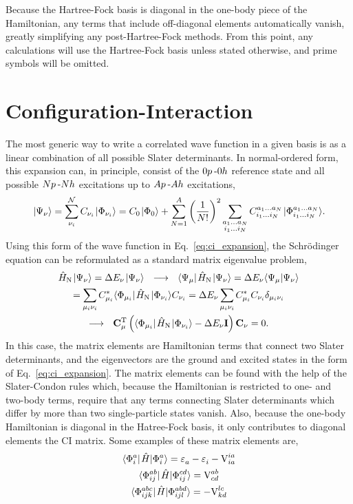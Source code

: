 \documentclass[thesis.tex]{subfiles}
\begin{document}
Because the Hartree-Fock basis is diagonal in the one-body piece of the Hamiltonian, any terms that include off-diagonal elements automatically vanish, greatly simplifying any post-Hartree-Fock methods.  From this point, any calculations will use the Hartree-Fock basis unless stated otherwise, and prime symbols will be omitted.


\section{Configuration-Interaction}
The most generic way to write a correlated wave function in a given basis is as a linear combination of all possible Slater determinants.  In normal-ordered form, this expansion can, in principle, consist of the $0p\hspace{2pt}\text{-}0h$ reference state and all possible $Np\hspace{2pt}\text{-}Nh$ excitations up to $Ap\hspace{2pt}\text{-}Ah$ excitations,
\begin{equation} \label{eq:ci_expansion}
  \hspace{1pt}\lvert \Psi_{\nu} \rangle = \sum_{\nu_{i}}^{\mathcal{N}}C_{\nu_{i}}\hspace{1pt}\lvert \Phi_{\nu_{i}} \rangle = C_{0}\hspace{1pt}\lvert \Phi_{0} \rangle + \sum_{N=1}^{A}\left(\frac{1}{N!}\right)^2 \sum_{\substack{a_{1} \ldots a_{N} \\ i_{1} \ldots i_{N}}} C^{a_{1} \ldots a_{N}}_{i_{1} \ldots i_{N}}\hspace{1pt}\lvert \Phi^{a_{1} \ldots a_{N}}_{i_{1} \ldots i_{N}} \rangle.
\end{equation}
Using this form of the wave function in Eq.\ \eqref{eq:ci_expansion}, the Schr\"{o}dinger equation can be reformulated as a standard matrix eigenvalue problem,
\begin{gather}
  \HamN\ket{\Psi_{\nu}} = \Ecorr_{\nu}\ket{\Psi_{\nu}}\ \ \longrightarrow\ \ \element{\Psi_{\mu}}{\HamN}{\Psi_{\nu}} = \Ecorr_{\nu}\braket{\Psi_{\mu}}{\Psi_{\nu}} \notag \\
  = \sum_{\mathclap{\mu_{i}\nu_{i}}}C^{*}_{\mu_{i}}\element{\Phi_{\mu_{i}}}{\HamN}{\Phi_{\nu_{i}}}C_{\nu_{i}} = \Ecorr_{\nu}\sum_{\mathclap{\mu_{i}\nu_{i}}}C^{*}_{\mu_{i}}C_{\nu_{i}}\delta_{\mu_{i}\nu_{i}} \notag \\
  \longrightarrow\ \ \mathbf{C}^{\text{T}}_{\mu}\left(\element{\Phi_{\mu_{i}}}{\HamN}{\Phi_{\nu_{i}}} - \Ecorr_{\nu}\mathbf{I}\right)\mathbf{C}_{\nu} = 0.
\end{gather}
In this case, the matrix elements are Hamiltonian terms that connect two Slater determinants, and the eigenvectors are the ground and excited states in the form of Eq.\ \eqref{eq:ci_expansion}.  The matrix elements can be found with the help of the Slater-Condon rules \cite{SLATER1929,CONDON1930} which, because the Hamiltonian is restricted to one- and two-body terms, require that any terms connecting Slater determinants which differ by more than two single-particle states vanish.  Also, because the one-body Hamiltonian is diagonal in the Hatree-Fock basis, it only contributes to diagonal elements the CI matrix.  Some examples of these matrix elements are,
\begin{gather}
  \element{\Phi^{a}_{i}}{\Ham}{\Phi^{a}_{i}} = \Edenom{}{a} - \Edenom{}{i} - \vint{ia}{ia} \\
  \element{\Phi^{ab}_{ij}}{\Ham}{\Phi^{cd}_{ij}} = \vint{ab}{cd} \\
  \element{\Phi^{abc}_{ijk}}{\Ham}{\Phi^{abd}_{ijl}} = -\vint{lc}{kd}
\end{gather}
\end{document}

